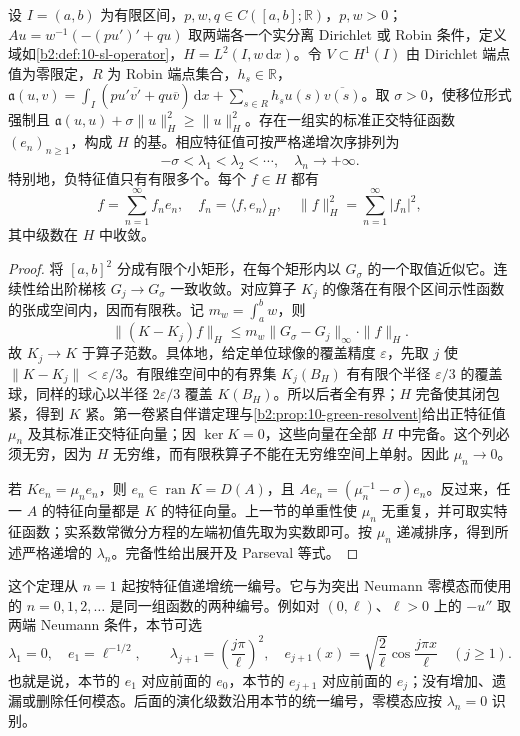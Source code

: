 \begin{theorem}\label{b2:thm:10-sl-spectral}
设 \(I=(a,b)\) 为有限区间，\(p,w,q\in C([a,b];\mathbb R)\)，\(p,w>0\)；\(Au=w^{-1}(-(pu')'+qu)\) 取两端各一个实分离 Dirichlet 或 Robin 条件，定义域如\cref{b2:def:10-sl-operator}，\(H=L^2(I,w\,\mathrm dx)\)。令 \(V\subset H^1(I)\) 由 Dirichlet 端点值为零限定，\(R\) 为 Robin 端点集合，\(h_s\in\mathbb R\)，\(\mathfrak a(u,v)=\int_I(pu'\overline{v'}+qu\overline v)\,\mathrm dx+\sum_{s\in R}h_su(s)\overline{v(s)}\)。取 \(\sigma>0\)，使移位形式强制且 \(\mathfrak a(u,u)+\sigma\|u\|_H^2\geq\|u\|_H^2\)。存在一组实的标准正交特征函数 \((e_n)_{n\geq1}\)，构成 \(H\) 的基。相应特征值可按严格递增次序排列为
\[
 -\sigma<\lambda_1<\lambda_2<\cdots,
 \quad\lambda_n\longrightarrow+\infty.
\]
特别地，负特征值只有有限多个。每个 \(f\in H\) 都有
\[
 f=\sum_{n=1}^{\infty}f_ne_n,
 \quad f_n=\langle f,e_n\rangle_H,
 \quad\|f\|_H^2=\sum_{n=1}^{\infty}|f_n|^2,
\]
其中级数在 \(H\) 中收敛。
\end{theorem}
\begin{proof}
将 \([a,b]^2\) 分成有限个小矩形，在每个矩形内以 \(G_\sigma\) 的一个取值近似它。连续性给出阶梯核 \(G_j\to G_\sigma\) 一致收敛。对应算子 \(K_j\) 的像落在有限个区间示性函数的张成空间内，因而有限秩。记 \(m_w=\int_a^bw\)，则
\[
 \|(K-K_j)f\|_H
 \leq m_w\|G_\sigma-G_j\|_\infty\cdot\|f\|_H.
\]
故 \(K_j\to K\) 于算子范数。具体地，给定单位球像的覆盖精度 \(\varepsilon\)，先取 \(j\) 使 \(\|K-K_j\|<\varepsilon/3\)。有限维空间中的有界集 \(K_j(B_H)\) 有有限个半径 \(\varepsilon/3\) 的覆盖球，同样的球心以半径 \(2\varepsilon/3\) 覆盖 \(K(B_H)\)。所以后者全有界；\(H\) 完备使其闭包紧，得到 \(K\) 紧。第一卷紧自伴谱定理与\cref{b2:prop:10-green-resolvent}给出正特征值 \(\mu_n\) 及其标准正交特征向量；因 \(\ker K=0\)，这些向量在全部 \(H\) 中完备。这个列必须无穷，因为 \(H\) 无穷维，而有限秩算子不能在无穷维空间上单射。因此 \(\mu_n\to0\)。

若 \(Ke_n=\mu_ne_n\)，则 \(e_n\in\operatorname{ran}K=D(A)\)，且 \(Ae_n=(\mu_n^{-1}-\sigma)e_n\)。反过来，任一 \(A\) 的特征向量都是 \(K\) 的特征向量。上一节的单重性使 \(\mu_n\) 无重复，并可取实特征函数；实系数常微分方程的左端初值先取为实数即可。按 \(\mu_n\) 递减排序，得到所述严格递增的 \(\lambda_n\)。完备性给出展开及 Parseval 等式。
\end{proof}

这个定理从 \(n=1\) 起按特征值递增统一编号。它与为突出 Neumann 零模态而使用的 \(n=0,1,2,\ldots\) 是同一组函数的两种编号。例如对 \((0,\ell)\)、\(\ell>0\) 上的 \(-u''\) 取两端 Neumann 条件，本节可选
\[
 \lambda_1=0,\quad e_1=\ell^{-1/2},\qquad
 \lambda_{j+1}=\left(\frac{j\pi}{\ell}\right)^2,\quad
 e_{j+1}(x)=\sqrt{\frac2\ell}\cos\frac{j\pi x}{\ell}\quad(j\geq1).
\]
也就是说，本节的 \(e_1\) 对应前面的 \(e_0\)，本节的 \(e_{j+1}\) 对应前面的 \(e_j\)；没有增加、遗漏或删除任何模态。后面的演化级数沿用本节的统一编号，零模态应按 \(\lambda_n=0\) 识别。

